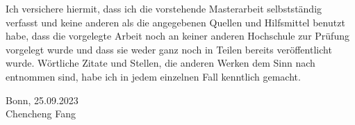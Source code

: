 \documentclass[12pt, a4paper]{article}
\theoremstyle{MAstyle} \newtheorem{assumption}{Assumption}[section]
\theoremstyle{MAstyle} \newtheorem{definition}{Definition}[section]
\theoremstyle{MAstyle} \newtheorem{theorem}{Theorem}[section]
\theoremstyle{MAstyle} \newtheorem{corollary}{Corollary}[section]
\begin{document}
		\vspace{3cm}
		
		Ich versichere hiermit, dass ich die vorstehende Masterarbeit
		selbstständig verfasst und keine anderen als die angegebenen Quellen
		und Hilfsmittel benutzt habe, dass die vorgelegte Arbeit noch an keiner
		anderen Hochschule zur Prüfung vorgelegt wurde und dass sie weder
		ganz noch in Teilen bereits veröffentlicht wurde. Wörtliche Zitate und
		Stellen, die anderen Werken dem Sinn nach entnommen sind, habe ich
		in jedem einzelnen Fall kenntlich gemacht.
		
		\vspace{2cm}
		Bonn, 25.09.2023 \hrulefill \\
		\hspace*{0mm}Chencheng Fang
		
		\vspace{\fill}
\end{document}
